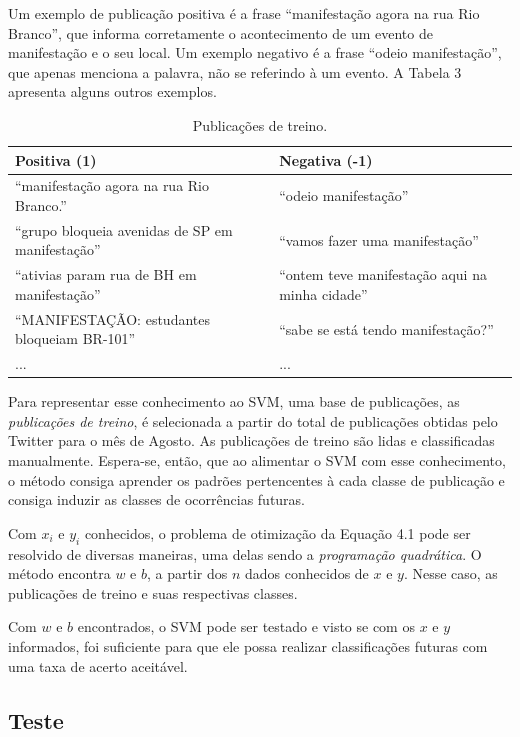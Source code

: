 Um exemplo de publicação positiva é a frase ``manifestação agora na rua Rio Branco'', que informa corretamente o acontecimento de um evento de manifestação e o seu local. Um exemplo negativo é a frase ``odeio manifestação'', que apenas menciona a palavra, não se referindo à um evento. A Tabela 3 apresenta alguns outros exemplos.

\begin{table}[ht]
	\caption{Publicações de treino.}
	\centering
	\begin{tabular}{| p{7cm} | p{7cm} |}
		\hline
		\textbf{Positiva (1)} & \textbf{Negativa (-1)} \\ [0.5ex] \hline \hline
    ``manifestação agora na rua Rio Branco.'' & ``odeio manifestação'' \\ \hline
    ``grupo bloqueia avenidas de SP em manifestação'' & ``vamos fazer uma manifestação'' \\ \hline
    ``ativias param rua de BH em manifestação'' & ``ontem teve manifestação aqui na minha cidade'' \\ \hline
    ``MANIFESTAÇÃO: estudantes bloqueiam BR-101'' & ``sabe se está tendo manifestação?'' \\
    ... & ... \\ [1ex]
		\hline
	\end{tabular}
	\label{table:nonlin}
\end{table}

Para representar esse conhecimento ao SVM, uma base de publicações, as \textit{publicações de treino}, é selecionada a partir do total de publicações obtidas pelo Twitter para o mês de Agosto. As publicações de treino são lidas e classificadas manualmente. Espera-se, então, que ao alimentar o SVM com esse conhecimento, o método consiga aprender os padrões pertencentes à cada classe de publicação e consiga induzir as classes de ocorrências futuras.

Com ${x_i}$ e ${y_i}$ conhecidos, o problema de otimização da Equação 4.1 pode ser resolvido de diversas maneiras, uma delas sendo a \textit{programação quadrática}. O método encontra $w$ e $b$, a partir dos $n$ dados conhecidos de $x$ e $y$. Nesse caso, as publicações de treino e suas respectivas classes.

Com $w$ e $b$ encontrados, o SVM pode ser testado e visto se com os $x$ e $y$ informados, foi suficiente para que ele possa realizar classificações futuras com uma taxa de acerto aceitável.

\subsection{Teste}

